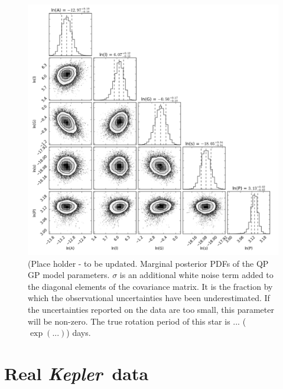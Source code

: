 \documentclass[useAMS, usenatbib, preprint, 12pt]{aastex}
\newcommand{\Kepler}{{\it Kepler}}
\newcommand{\kepler}{\Kepler}
\begin{document}
\begin{figure}
\begin{center}
\includegraphics[width=6in, clip=true]{figures/0002_triangle.png}
\caption{(Place holder - to be updated.
Marginal posterior PDFs of the QP GP model parameters. $\sigma$ is an
additional white noise term added to the diagonal elements of the covariance
matrix. It is the fraction by which the observational uncertainties have been
underestimated. If the uncertainties reported on the data are too small, this
parameter will be non-zero.
The true rotation period of this star is ... ($\exp(...)$) days.}
\label{fig:gp_posteriors}
\end{center}
\end{figure}

\section{Real \kepler\ data}
\label{sec:kepler}
\end{document}
